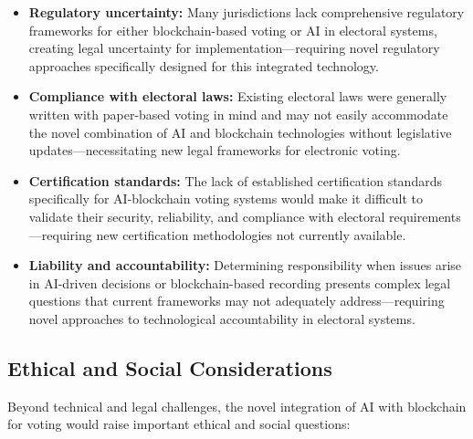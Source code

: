 \documentclass[conference]{IEEEtran}
\begin{document}
\begin{itemize}
    \item \textbf{Regulatory uncertainty:} Many jurisdictions lack comprehensive regulatory frameworks for either blockchain-based voting or AI in electoral systems, creating legal uncertainty for implementation—requiring novel regulatory approaches specifically designed for this integrated technology.
    
    \item \textbf{Compliance with electoral laws:} Existing electoral laws were generally written with paper-based voting in mind and may not easily accommodate the novel combination of AI and blockchain technologies without legislative updates—necessitating new legal frameworks for electronic voting.
    
    \item \textbf{Certification standards:} The lack of established certification standards specifically for AI-blockchain voting systems would make it difficult to validate their security, reliability, and compliance with electoral requirements—requiring new certification methodologies not currently available.
    
    \item \textbf{Liability and accountability:} Determining responsibility when issues arise in AI-driven decisions or blockchain-based recording presents complex legal questions that current frameworks may not adequately address—requiring novel approaches to technological accountability in electoral systems.
\end{itemize}

\subsection{Ethical and Social Considerations}
Beyond technical and legal challenges, the novel integration of AI with blockchain for voting would raise important ethical and social questions:
\end{document}
